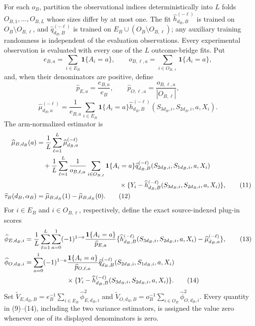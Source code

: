 For each \(o_B\), partition the observational indices deterministically into \(L\) folds \(O_{B,1},\ldots,O_{B,L}\) whose sizes differ by at most one.  The fit \(\widehat h_{d_B,B}^{(-\ell)}\) is trained on \(O_B\setminus O_{B,\ell}\), and \(\widehat q_{d_B,B}^{(-\ell)}\) is trained on \(E_B\cup(O_B\setminus O_{B,\ell})\); any auxiliary training randomness is independent of the evaluation observations.  Every experimental observation is evaluated with every one of the \(L\) outcome-bridge fits.  Put
\[
 e_{B,a}=\sum_{i\in E_B}\mathbf 1\{A_i=a\},
 \qquad
 o_{B,\ell,a}=\sum_{i\in O_{B,\ell}}\mathbf 1\{A_i=a\},     \tag{8}
\]
and, when their denominators are positive, define
\[
 \widehat p_{E,a}=\frac{e_{B,a}}{e_B},
 \qquad
 \widehat p_{O,\ell,a}=\frac{o_{B,\ell,a}}{|O_{B,\ell}|},   \tag{9}
\]
\[
 \widehat\mu_{d_B,a}^{(-\ell)}
 =\frac1{e_{B,a}}\sum_{i\in E_B}\mathbf 1\{A_i=a\}
 \widehat h_{d_B,B}^{(-\ell)}(S_{3d_B,i},S_{2d_B,i},a,X_i). \tag{10}
\]
The arm-normalized estimator is
\begin{align}
 \widehat\mu_{B,d_B}(a)
 &=\frac1L\sum_{\ell=1}^L\widehat\mu_{d_B,a}^{(-\ell)}\notag\\
 &\quad+\frac1L\sum_{\ell=1}^L\frac1{o_{B,\ell,a}}
 \sum_{i\in O_{B,\ell}}\mathbf 1\{A_i=a\}
 \widehat q_{d_B,B}^{(-\ell)}(S_{2d_B,i},S_{1d_B,i},a,X_i)\notag\\
 &\hspace{44mm}\times
 \{Y_i-\widehat h_{d_B,B}^{(-\ell)}(S_{3d_B,i},S_{2d_B,i},a,X_i)\},
                                                                  \tag{11}\\
 \widehat\tau_B(d_B,\alpha_B)&=\widehat\mu_{B,d_B}(1)-\widehat\mu_{B,d_B}(0).
                                                                  \tag{12}
\end{align}
For \(i\in E_B\) and \(i\in O_{B,\ell}\), respectively, define the exact source-indexed plug-in scores
\begin{align}
 \widehat\phi_{E,d_B,i}
 &=\frac1L\sum_{\ell=1}^L\sum_{a=0}^1(-1)^{1-a}
 \frac{\mathbf 1\{A_i=a\}}{\widehat p_{E,a}}
 \{\widehat h_{d_B,B}^{(-\ell)}(S_{3d_B,i},S_{2d_B,i},a,X_i)
   -\widehat\mu_{d_B,a}^{(-\ell)}\},                       \tag{13}\\
 \widehat\phi_{O,d_B,i}
 &=\sum_{a=0}^1(-1)^{1-a}
 \frac{\mathbf 1\{A_i=a\}}{\widehat p_{O,\ell,a}}
 \widehat q_{d_B,B}^{(-\ell)}(S_{2d_B,i},S_{1d_B,i},a,X_i)\notag\\
 &\hspace{22mm}\times
 \{Y_i-\widehat h_{d_B,B}^{(-\ell)}(S_{3d_B,i},S_{2d_B,i},a,X_i)\}.
                                                                  \tag{14}
\end{align}
Set \(\widetilde V_{E,d_B,B}=e_B^{-1}\sum_{i\in E_B}\widehat\phi_{E,d_B,i}^2\) and \(\widetilde V_{O,d_B,B}=o_B^{-1}\sum_{i\in O_B}\widehat\phi_{O,d_B,i}^2\).  Every quantity in (9)--(14), including the two variance estimators, is assigned the value zero whenever one of its displayed denominators is zero.

